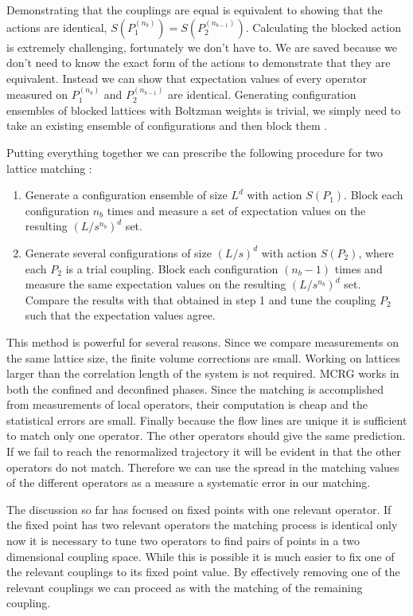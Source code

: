 Demonstrating that the couplings are equal is equivalent to showing that the actions are identical, $S(P_1^{(n_b)})=S(P_2^{(n_{b-1})})$.
Calculating the blocked action is extremely challenging, fortunately we don't have to.
We are saved because we don't need to know the exact form of the actions to demonstrate that they are equivalent.
Instead we can show that expectation values of every operator measured on $P_1^{(n_b)}$ and $P_2^{(n_{b-1})}$ are identical.
Generating configuration ensembles of blocked lattices with Boltzman weights is trivial, we simply need to take an existing ensemble of configurations and then block them \cite{Swendsen:1979}.

Putting everything together we can prescribe the following procedure for two lattice matching \cite{Hasenfratz:2009}:
\begin{enumerate}
  \item Generate a configuration ensemble of size $L^d$ with action $S(P_1)$. Block each configuration $n_b$ times and measure a set of expectation values on the resulting $(L/s^{n_b})^d$ set.
  \item Generate several configurations of size $(L/s)^d$ with action $S(P_2)$, where each $P_2$ is a trial coupling. Block each configuration $(n_b-1)$ times and measure the same expectation values on the resulting $(L/s^{n_b})^d$ set. Compare the results with that obtained in step 1 and tune the coupling $P_2$ such that the expectation values agree. 
\end{enumerate}

This method is powerful for several reasons.
Since we compare measurements on the same lattice size, the finite volume corrections are small.
Working on lattices larger than the correlation length of the system is not required.
MCRG works in both the confined and deconfined phases.
Since the matching is accomplished from measurements of local operators, their computation is cheap and the statistical errors are small.
Finally because the flow lines are unique it is sufficient to match only one operator.
The other operators should give the same prediction.
If we fail to reach the renormalized trajectory it will be evident in that the other operators do not match.
Therefore we can use the spread in the matching values of the different operators as a measure a systematic error in our matching.

The discussion so far has focused on fixed points with one relevant operator.
If the fixed point has two relevant operators the matching process is identical only now it is necessary to tune two operators to find pairs of points in a two dimensional coupling space.
While this is possible it is much easier to fix one of the relevant couplings to its fixed point value.
By effectively removing one of the relevant couplings we can proceed as with the matching of the remaining coupling.

